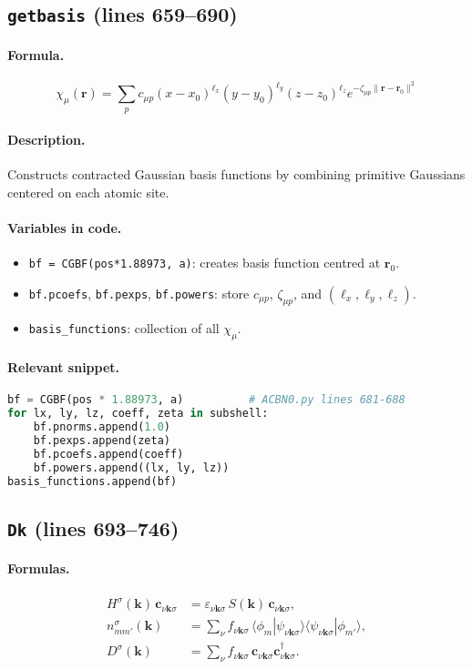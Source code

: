 \documentclass[11pt]{article}
\begin{document}
\subsection{\texttt{getbasis} (lines 659--690)}
\paragraph{Formula.}
\[\chi_{\mu}(\mathbf{r}) = \sum_p c_{\mu p} (x - x_0)^{\ell_x}(y - y_0)^{\ell_y}(z - z_0)^{\ell_z} e^{-\zeta_{\mu p}\lVert \mathbf{r} - \mathbf{r}_0 \rVert^2}\]
\paragraph{Description.}
Constructs contracted Gaussian basis functions by combining primitive Gaussians centered on each atomic site.
\paragraph{Variables in code.}
\begin{itemize}[noitemsep]
  \item \verb|bf = CGBF(pos*1.88973, a)|: creates basis function centred at $\mathbf{r}_0$.
  \item \verb|bf.pcoefs|, \verb|bf.pexps|, \verb|bf.powers|: store $c_{\mu p}$, $\zeta_{\mu p}$, and $(\ell_x,\ell_y,\ell_z)$.
  \item \verb|basis_functions|: collection of all $\chi_{\mu}$.
\end{itemize}
\paragraph{Relevant snippet.}
\begin{lstlisting}[language=python]
bf = CGBF(pos * 1.88973, a)          # ACBN0.py lines 681-688
for lx, ly, lz, coeff, zeta in subshell:
    bf.pnorms.append(1.0)
    bf.pexps.append(zeta)
    bf.pcoefs.append(coeff)
    bf.powers.append((lx, ly, lz))
basis_functions.append(bf)
\end{lstlisting}

\subsection{\texttt{Dk} (lines 693--746)}
\paragraph{Formulas.}
\begin{align}
  H^{\sigma}(\mathbf{k})\, \mathbf{c}_{\nu\mathbf{k}\sigma} &= \varepsilon_{\nu\mathbf{k}\sigma}\, S(\mathbf{k})\, \mathbf{c}_{\nu\mathbf{k}\sigma},\\[4pt]
  n^{\sigma}_{mm'}(\mathbf{k}) &= \sum_{\nu} f_{\nu\mathbf{k}\sigma}\, \langle \phi_m | \psi_{\nu\mathbf{k}\sigma} \rangle \langle \psi_{\nu\mathbf{k}\sigma} | \phi_{m'} \rangle,\\[4pt]
  D^{\sigma}(\mathbf{k}) &= \sum_{\nu} f_{\nu\mathbf{k}\sigma}\, \mathbf{c}_{\nu\mathbf{k}\sigma}\mathbf{c}^{\dagger}_{\nu\mathbf{k}\sigma}.
\end{align}
\end{document}
